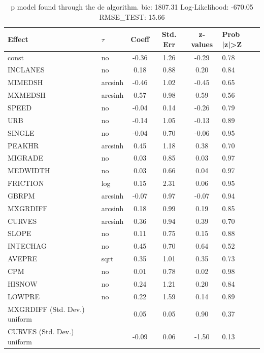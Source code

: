 \begin{table}
	\caption{p model found through the de algorithm. bic: 1807.31 Log-Likelihood: -670.05 RMSE_TEST: 15.66}
	\begin{center}
		\begin{tabular}{|l|l|c|c|c|l|}
			\hline
			Effect & $\tau$ & Coeff & Std. Err & z-values & Prob |z|>Z \\
			\hline
			const & no & -0.36 & 1.26 & -0.29 & 0.78 \\
			\hline
			INCLANES & no & 0.18 & 0.88 & 0.20 & 0.84 \\
			\hline
			MIMEDSH & arcsinh & -0.46 & 1.02 & -0.45 & 0.65 \\
			\hline
			MXMEDSH & arcsinh & 0.57 & 0.98 & 0.59 & 0.56 \\
			\hline
			SPEED & no & -0.04 & 0.14 & -0.26 & 0.79 \\
			\hline
			URB & no & -0.14 & 1.05 & -0.13 & 0.89 \\
			\hline
			SINGLE & no & -0.04 & 0.70 & -0.06 & 0.95 \\
			\hline
			PEAKHR & arcsinh & 0.45 & 1.18 & 0.38 & 0.70 \\
			\hline
			MIGRADE & no & 0.03 & 0.85 & 0.03 & 0.97 \\
			\hline
			MEDWIDTH & no & 0.03 & 0.66 & 0.04 & 0.97 \\
			\hline
			FRICTION & log & 0.15 & 2.31 & 0.06 & 0.95 \\
			\hline
			GBRPM & arcsinh & -0.07 & 0.97 & -0.07 & 0.94 \\
			\hline
			MXGRDIFF & arcsinh & 0.18 & 0.99 & 0.19 & 0.85 \\
			\hline
			CURVES & arcsinh & 0.36 & 0.94 & 0.39 & 0.70 \\
			\hline
			SLOPE & no & 0.11 & 0.75 & 0.15 & 0.88 \\
			\hline
			INTECHAG & no & 0.45 & 0.70 & 0.64 & 0.52 \\
			\hline
			AVEPRE & sqrt & 0.35 & 1.01 & 0.35 & 0.73 \\
			\hline
			CPM & no & 0.01 & 0.78 & 0.02 & 0.98 \\
			\hline
			HISNOW & no & 0.24 & 1.21 & 0.20 & 0.84 \\
			\hline
			LOWPRE & no & 0.22 & 1.59 & 0.14 & 0.89 \\
			\hline
			MXGRDIFF (Std. Dev.) uniform &  & 0.05 & 0.05 & 0.90 & 0.37 \\
			\hline
			CURVES (Std. Dev.) uniform &  & -0.09 & 0.06 & -1.50 & 0.13 \\

\end{tabular}
\end{center}
\end{table}
